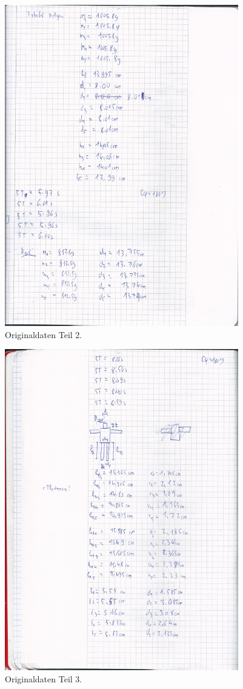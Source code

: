 \begin{figure}[H]
  \centering
  \includegraphics[height=14cm]{original2.jpg}
  \caption{Originaldaten Teil 2.}
  \label{fig:original2}
\end{figure}

\begin{figure}[H]
  \centering
  \includegraphics[height=14cm]{original3.jpg}
  \caption{Originaldaten Teil 3.}
  \label{fig:original3}
\end{figure}


